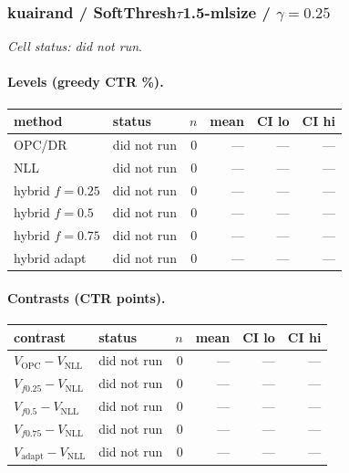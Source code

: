 \documentclass[10pt,a4paper]{article}
\begin{document}
\subsubsection{kuairand / SoftThresh$\tau$1.5-mlsize / $\gamma=0.25$}
\emph{Cell status: did not run}.
\paragraph{Levels (greedy CTR \%).}
{\centering\small\begin{tabular}{llrrrr}
\toprule method & status & $n$ & mean & CI lo & CI hi \\
\midrule
OPC/DR & did not run & 0 & --- & --- & --- \\
NLL & did not run & 0 & --- & --- & --- \\
hybrid $f{=}0.25$ & did not run & 0 & --- & --- & --- \\
hybrid $f{=}0.5$ & did not run & 0 & --- & --- & --- \\
hybrid $f{=}0.75$ & did not run & 0 & --- & --- & --- \\
hybrid adapt & did not run & 0 & --- & --- & --- \\
\bottomrule\end{tabular}\par}
\paragraph{Contrasts (CTR points).}
{\centering\small\begin{tabular}{llrrrr}
\toprule contrast & status & $n$ & mean & CI lo & CI hi \\
\midrule
$V_{\mathrm{OPC}}-V_{\mathrm{NLL}}$ & did not run & 0 & --- & --- & --- \\
$V_{f0.25}-V_{\mathrm{NLL}}$ & did not run & 0 & --- & --- & --- \\
$V_{f0.5}-V_{\mathrm{NLL}}$ & did not run & 0 & --- & --- & --- \\
$V_{f0.75}-V_{\mathrm{NLL}}$ & did not run & 0 & --- & --- & --- \\
$V_{\mathrm{adapt}}-V_{\mathrm{NLL}}$ & did not run & 0 & --- & --- & --- \\
\bottomrule\end{tabular}\par}
\end{document}
